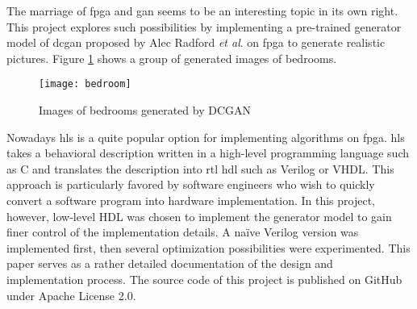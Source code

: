 The marriage of \gls{fpga} and \gls{gan} seems to be an interesting topic in its own right. This project
explores such possibilities by implementing a pre-trained generator model of \gls{dcgan} proposed by
Alec Radford \textit{et al}. \cite{radford:conv_gan} on \gls{fpga} to generate realistic pictures.
Figure \ref{fig:bedroom} shows a group of generated images of bedrooms.

\begin{figure}[h]
  \centering
  \texttt{[image: bedroom]}
  \caption{Images of bedrooms generated by DCGAN \cite{radford:conv_gan}}
  \label{fig:bedroom}
\end{figure}

Nowadays \gls{hls} is a quite popular option for implementing algorithms on \gls{fpga}. \gls{hls} takes a
behavioral description written in a high-level programming language such as C and translates the description
into \gls{rtl} \gls{hdl} such as Verilog or VHDL. This approach is particularly favored by software
engineers who wish to quickly convert a software program into hardware implementation. In this project,
however, low-level HDL was chosen to implement the generator model to gain finer control of the implementation
details. A naïve Verilog version was implemented first, then several optimization possibilities were
experimented. This paper serves as a rather detailed documentation of the design and implementation process.
The source code of this project is published on GitHub \cite{github:dcgan_fpga} under Apache License 2.0.

\clearpage %
